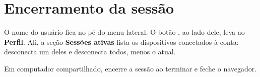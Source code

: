 \section{Encerramento da sessão}

O nome do usuário fica no pé do menu lateral. O botão \botao{\faEllipsisV}, ao lado
dele, leva ao \textbf{Perfil}. Ali, a seção \textbf{Sessões ativas} lista os
dispositivos conectados à conta:  desconecta um deles e
 desconecta todos, menos o atual.

Em computador compartilhado, encerre a sessão ao terminar e feche o navegador.

\fimdecapitulo
